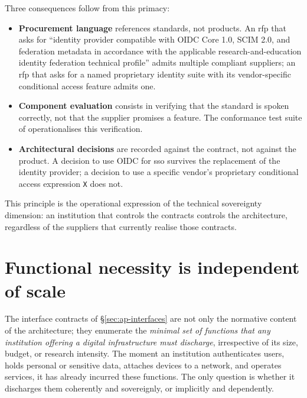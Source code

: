 Three consequences follow from this primacy:

\begin{itemize}[leftmargin=1.5em,nosep]
  \item \textbf{Procurement language} references standards, not
    products. An \gls{rfp} that asks for ``identity provider compatible
    with OIDC Core 1.0, SCIM 2.0, and federation metadata in
    accordance with the applicable research-and-education identity
    federation technical profile'' admits multiple
    compliant suppliers; an \gls{rfp} that asks for a named
    proprietary identity suite with its vendor-specific conditional
    access feature admits one.
  \item \textbf{Component evaluation} consists in verifying that the
    standard is spoken correctly, not that the supplier promises a
    feature. The conformance test suite of
    operationalises this verification.
  \item \textbf{Architectural decisions} are recorded against the
    contract, not against the product. A decision to use OIDC for
    \gls{sso} survives the replacement of the identity provider; a
    decision to use a specific vendor's proprietary conditional
    access expression \texttt{X} does not.
\end{itemize}

This principle is the operational expression of the technical
sovereignty dimension: an institution that controls the contracts
controls the architecture, regardless of the suppliers that currently
realise those contracts.

\section{Functional necessity is independent of scale}
\label{sec:ap-necessity}

The interface contracts of \S\ref{sec:ap-interfaces} are not only the
normative content of the architecture; they enumerate the
\emph{minimal set of functions that any institution offering a digital
infrastructure must discharge}, irrespective of its size, budget, or
research intensity. The moment an institution authenticates users,
holds personal or sensitive data, attaches devices to a network, and
operates services, it has already incurred these functions. The only
question is whether it discharges them coherently and sovereignly, or
implicitly and dependently.

